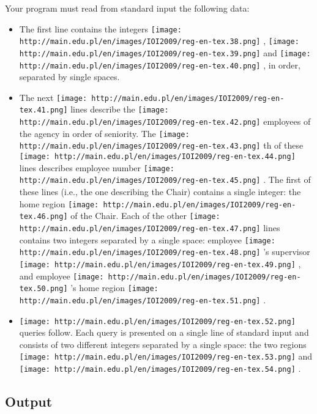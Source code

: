    Your program must read from standard input the following data:  
\begin{itemize}
	\item     The first line contains the integers    
\texttt{[image: http://main.edu.pl/en/images/IOI2009/reg-en-tex.38.png]}    ,    
\texttt{[image: http://main.edu.pl/en/images/IOI2009/reg-en-tex.39.png]}    and    
\texttt{[image: http://main.edu.pl/en/images/IOI2009/reg-en-tex.40.png]}    , in order, separated by single spaces.   
	\item     The next    
\texttt{[image: http://main.edu.pl/en/images/IOI2009/reg-en-tex.41.png]}    lines describe the    
\texttt{[image: http://main.edu.pl/en/images/IOI2009/reg-en-tex.42.png]}    employees of the agency in order of seniority. The    
\texttt{[image: http://main.edu.pl/en/images/IOI2009/reg-en-tex.43.png]}    th of these    
\texttt{[image: http://main.edu.pl/en/images/IOI2009/reg-en-tex.44.png]}    lines describes employee number    
\texttt{[image: http://main.edu.pl/en/images/IOI2009/reg-en-tex.45.png]}    . The first of these lines (i.e., the one describing the Chair) contains a single integer: the home region    
\texttt{[image: http://main.edu.pl/en/images/IOI2009/reg-en-tex.46.png]}    of the Chair. Each of the other    
\texttt{[image: http://main.edu.pl/en/images/IOI2009/reg-en-tex.47.png]}    lines contains two integers separated by a single space: employee    
\texttt{[image: http://main.edu.pl/en/images/IOI2009/reg-en-tex.48.png]}    's supervisor    
\texttt{[image: http://main.edu.pl/en/images/IOI2009/reg-en-tex.49.png]}    , and employee    
\texttt{[image: http://main.edu.pl/en/images/IOI2009/reg-en-tex.50.png]}    's home region    
\texttt{[image: http://main.edu.pl/en/images/IOI2009/reg-en-tex.51.png]}    .   
	\item 
\texttt{[image: http://main.edu.pl/en/images/IOI2009/reg-en-tex.52.png]}    queries follow. Each query is presented on a single line of standard  input and consists of two different integers separated by a single  space: the two regions    
\texttt{[image: http://main.edu.pl/en/images/IOI2009/reg-en-tex.53.png]}    and    
\texttt{[image: http://main.edu.pl/en/images/IOI2009/reg-en-tex.54.png]}    .   
\end{itemize}

\subsection{   Output  }


